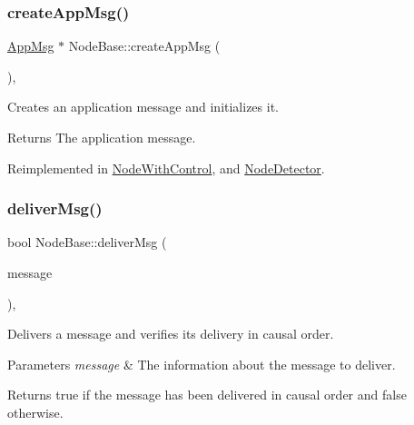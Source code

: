 \subsubsection{\texorpdfstring{create\+App\+Msg()}{createAppMsg()}}
{\footnotesize\ttfamily \hyperlink{class_app_msg}{App\+Msg} $\ast$ Node\+Base\+::create\+App\+Msg (\begin{DoxyParamCaption}{ }\end{DoxyParamCaption})\hspace{0.3cm}{\ttfamily [protected]}, {\ttfamily [virtual]}}



Creates an application message and initializes it. 

\begin{DoxyReturn}{Returns}
The application message. 
\end{DoxyReturn}


Reimplemented in \hyperlink{class_node_with_control_a7772568c2836f5f204952ebe659e0049}{Node\+With\+Control}, and \hyperlink{class_node_detector_a7100349647350ad5e3aeb1ed4669c723}{Node\+Detector}.

\mbox{\label{class_node_base_a49052382add1123da26db6bfb687d254}} 
\subsubsection{\texorpdfstring{deliver\+Msg()}{deliverMsg()}}
{\footnotesize\ttfamily bool Node\+Base\+::deliver\+Msg (\begin{DoxyParamCaption}\item[{const \hyperlink{structures_8h_a7e7bdc1d2fff8a9436f2f352b2711ed6}{message\+Info} \&}]{message }\end{DoxyParamCaption})\hspace{0.3cm}{\ttfamily [protected]}, {\ttfamily [virtual]}}



Delivers a message and verifies its delivery in causal order. 


\begin{DoxyParams}{Parameters}
{\em message} & The information about the message to deliver. \\
\hline
\end{DoxyParams}
\begin{DoxyReturn}{Returns}
true if the message has been delivered in causal order and false otherwise. 
\end{DoxyReturn}


